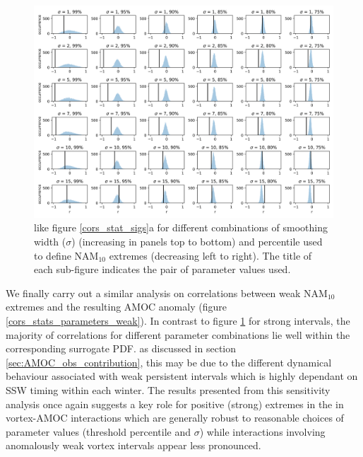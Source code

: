 \newpage
\begin{landscape}
\begin{figure}[h!]
\begin{center}
\noindent\includegraphics[width =0.9\linewidth]{Figures/Figures-surface/cors_sigs_thresh_and_sigma.png} 
\caption{like figure \ref{cors_stat_sigs}a for different combinations of smoothing width ($\sigma$) (increasing in panels top to bottom) and percentile used to define NAM$_{10}$ extremes (decreasing left to right). The title of each sub-figure indicates the pair of parameter values used.}%
\label{cors_stats_parameters_strong}
\end{center}
\end{figure}
\end{landscape}


We finally carry out a similar analysis on correlations between weak NAM$_{10}$ extremes and the resulting AMOC anomaly (figure \ref{cors_stats_parameters_weak}). In contrast to figure \ref{cors_stats_parameters_strong} for strong intervals, the majority of correlations for different parameter combinations lie well within the corresponding surrogate PDF. as discussed in section \ref{sec:AMOC_obs_contribution}, this may be due to the different dynamical behaviour associated with weak persistent intervals which is highly dependant on SSW timing within each winter. The results presented from this sensitivity analysis once again suggests a key role for positive (strong) extremes in the in vortex-AMOC interactions which are generally robust to reasonable choices of parameter values (threshold percentile and $\sigma$) while interactions involving anomalously weak vortex intervals appear less pronounced. 

